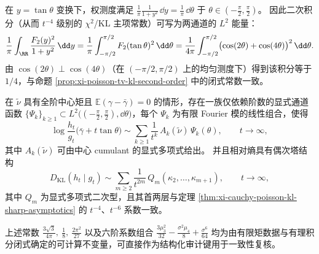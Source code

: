 \begin{remark}[二通道正交与二次常数的闭式读出]\label{rem:xi-poisson-second-order-orthogonal-constants}
在 \(y=\tan\theta\) 变换下，权测度满足
\(
\frac{1}{\pi}\frac{1}{1+y^2}\,\dd y=\frac{1}{\pi}\,\dd\theta
\) 于 \(\theta\in(-\tfrac{\pi}{2},\tfrac{\pi}{2})\)。
因此二次积分（从而 \(t^{-4}\) 级别的 \(\chi^2\)/KL 主项常数）可写为两通道的 \(L^2\) 能量：
\[
\frac{1}{\pi}\int_{\RR}\frac{F_2(y)^2}{1+y^2}\,\dd y
=\frac{1}{\pi}\int_{-\pi/2}^{\pi/2}F_2(\tan\theta)^2\,\dd\theta
=\frac{1}{4\pi}\int_{-\pi/2}^{\pi/2}\bigl(\cos(2\theta)+\cos(4\theta)\bigr)^2\,\dd\theta.
\]
由 \(\cos(2\theta)\perp \cos(4\theta)\)（在 \((-\pi/2,\pi/2)\) 上的均匀测度下）得到该积分等于 \(1/4\)，与命题 \ref{prop:xi-poisson-tv-kl-second-order} 中的闭式常数一致。
\end{remark}

\begin{conjecture}\label{conj:xi-cauchy-poisson-even-tower-channelization}
在 \(\tilde\nu\) 具有全阶中心矩且 \(\mathbb{E}(\gamma-\bar\gamma)=0\) 的情形，存在一族仅依赖阶数的显式通道函数 \(\{\Psi_k\}_{k\ge 1}\subset L^2\!\bigl((-\tfrac{\pi}{2},\tfrac{\pi}{2}),\dd\theta\bigr)\)，每个 \(\Psi_k\) 为有限 Fourier 模的线性组合，使得
\[
\log\frac{h_t}{g_t}\bigl(\bar\gamma+t\tan\theta\bigr)
\sim
\sum_{k\ge 1}\frac{1}{t^k}\,A_k(\tilde\nu)\,\Psi_k(\theta),
\qquad t\to\infty,
\]
其中 \(A_k(\tilde\nu)\) 可由中心 cumulant 的显式多项式给出。
并且相对熵具有偶次塔结构
\[
D_{\mathrm{KL}}(h_t\mid g_t)\sim \sum_{m\ge 2}\frac{1}{t^{2m}}\,Q_m(\kappa_2,\dots,\kappa_{m+1}),
\qquad t\to\infty,
\]
其中 \(Q_m\) 为显式多项式二次型，且其首两层与定理 \ref{thm:xi-cauchy-poisson-kl-sharp-asymptotics} 的 \(t^{-4}\)、\(t^{-6}\) 系数一致。
\end{conjecture}

\begin{remark}[常数向量作为可执行审计键]\label{rem:xi-cauchy-poisson-audit-keys}
上述常数
\(
\frac{3\sqrt3}{4\pi},\ \frac18,\ \frac{2\pi^2}{27}
\)
以及六阶系数组合
\(
\frac{3\mu_3^2}{32}-\frac{\sigma^2\mu_4}{8}+\frac{\sigma^6}{64}
\)
均为由有限矩数据与有理积分闭式确定的可计算不变量，可直接作为结构化审计键用于一致性复核。
\end{remark}

\endinput
